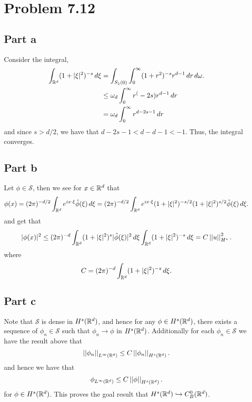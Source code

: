 \documentclass[12pt]{report}
\newcommand{\norm}[1]{\left|\left|#1\right|\right|}
\begin{document}
\maketitle

\section*{Problem 7.12}
\subsection*{Part a}
Consider the integral,
\begin{align*}
  \int_{\mathbb{R}^d}(1 + |\xi|^2)^{-s} \, d\xi &= \int_{S_1(0)}\int_0^\infty (1 + r^2)^{-s}r^{d-1} \, dr \, d\omega. \\
                                        &\leq \omega_d \int_0^\infty r^(-2s) r^{d-1} \, dr \\ 
                                        &= \omega_d \int_0^\infty r^{d-2s-1} \, dr
\end{align*}
and since $s > d/2$, we have that $d - 2s -1 < d-d - 1 < - 1$. Thus, the integral converges. 

\subsection*{Part b}
Let $\phi \in \mathcal{S}$, then we see for $x \in \mathbb{R}^d$ that
\begin{align*}
  \phi(x) = (2\pi)^{-d/2} \int_{\mathbb{R}^d} e^{ix \cdot \xi} \hat{\phi}(\xi) \, d\xi = (2\pi)^{-d/2} \int_{\mathbb{R}^d} e^{ix \cdot \xi} (1 + |\xi|^2)^{-s/2}(1+ |\xi|^2)^{s/2} \hat{\phi}(\xi) \, d\xi.
\end{align*}
and get that
\begin{align*}
  |\phi(x)|^2 \leq (2\pi)^{-d} \int_{\R^d} (1+|\xi|^2)^{s} |\hat{\phi}(\xi)|^2 \, d\xi \int_{\R^d} (1 + |\xi|^2)^{-s} \, d\xi = C \norm{u}_{H^s}^2.
\end{align*}
where 
\begin{equation*}
  C = (2\pi)^{-d} \int_{\mathbb{R}^d} (1+|\xi|^2)^{-s} \, d\xi.
\end{equation*}

\subsection*{Part c}
Note that $\mathcal{S}$ is dense in $H^s(\mathbb{R}^d)$, and hence for any $\phi \in H^s(\mathbb{R}^d)$, there exists a sequence of $\phi_n \in \mathcal{S}$ such that $\phi_n \to \phi$ in $H^s(\mathbb{R}^d)$. Additionally for each $\phi_n \in \mathcal{S}$ we have the result above that
\begin{equation*}
  \norm{\phi_n}_{L^\infty(\R^d)} \leq C \norm{\phi_n}_{H^s(\R^d)}.
\end{equation*}
and hence we have that
\begin{equation*}
  \phi_{L^\infty(\R^d)} \leq C \norm{\phi}_{H^s(\R^d)}.
\end{equation*}
for $\phi \in H^s(\mathbb{R}^d)$. This proves the goal result that $H^s(\mathbb{R}^d) \hookrightarrow C_B^0(\mathbb{R}^d)$.
\end{document}
